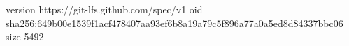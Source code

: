 version https://git-lfs.github.com/spec/v1
oid sha256:649b00e1539f1acf478407aa93ef6b8a19a79c5f896a77a0a5ed8d84337bbc06
size 5492
